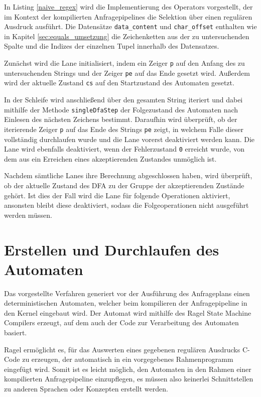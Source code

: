 In Listing \ref{naive_regex} wird die Implementierung des Operators vorgestellt, der im Kontext der kompilierten Anfragepipelines die Selektion über einen regulären Ausdruck ausführt.
Die Datensätze \texttt{data\_content} und \texttt{char\_offset} enthalten wie in Kapitel \ref{sec:equals_umsetzung} die Zeichenketten aus der zu untersuchenden Spalte und die Indizes der einzelnen Tupel innerhalb des Datensatzes.

Zunächst wird die Lane initialisiert, indem ein Zeiger \texttt{p} auf den Anfang des zu untersuchenden Strings und der Zeiger \texttt{pe} auf das Ende gesetzt wird.
Außerdem wird der aktuelle Zustand \texttt{cs} auf den Startzustand des Automaten gesetzt.

In der Schleife wird anschließend über den gesamten String iteriert und dabei mithilfe der Methode \texttt{singleDfaStep} der Folgezustand des Automaten nach Einlesen des nächsten Zeichens bestimmt.
Daraufhin wird überprüft, ob der iterierende Zeiger \texttt{p} auf das Ende des Strings \texttt{pe} zeigt, in welchem Falle dieser vollständig durchlaufen wurde und die Lane vorerst deaktiviert werden kann.
Die Lane wird ebenfalls deaktiviert, wenn der Fehlerzustand \texttt{0} erreicht wurde, von dem aus ein Erreichen eines akzeptierenden Zustandes unmöglich ist.

Nachdem sämtliche Lanes ihre Berechnung abgeschlossen haben, wird überprüft, ob der aktuelle Zustand des DFA zu der Gruppe der akzeptierenden Zustände gehört.
Ist dies der Fall wird die Lane für folgende Operationen aktiviert, ansonsten bleibt diese deaktiviert, sodass die Folgeoperationen nicht ausgeführt werden müssen.

\section{Erstellen und Durchlaufen des Automaten}
\label{sec:regex_duchlaufen}

Das vorgestellte Verfahren generiert vor der Ausführung des Anfrageplans einen deterministischen Automaten, welcher beim kompilieren der Anfragepipeline in den Kernel eingebaut wird.
Der Automat wird mithilfe des Ragel State Machine Compilers \cite{Thurston2009} erzeugt, auf dem auch der Code zur Verarbeitung des Automaten basiert.

Ragel ermöglicht es, für das Auswerten eines gegebenen regulären Ausdrucks C-Code zu erzeugen, der automatisch in ein vorgegebenes Rahmenprogramm eingefügt wird.
Somit ist es leicht möglich, den Automaten in den Rahmen einer kompilierten Anfragepipeline einzupflegen, es müssen also keinerlei Schnittstellen zu anderen Sprachen oder Konzepten erstellt werden.

